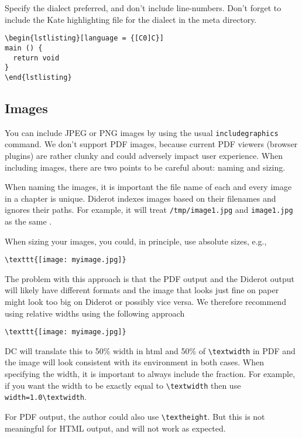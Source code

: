 \begin{example}
Specify the dialect preferred, and don't include line-numbers.
%
Don't forget to include the Kate highlighting file for the dialect in the meta directory.

\begin{verbatim}
\begin{lstlisting}[language = {[C0]C}]
main () {
  return void
}
\end{lstlisting}
\end{verbatim}
\end{example}
\subsection{Images}

You can include JPEG or PNG images by using the usual \lstinline`includegraphics` command.  
%
We don't support PDF images, because current PDF viewers (browser plugins) are rather clunky and could adversely impact user experience.
%
When including images, there are two points to be careful about: naming and sizing.
%

When naming the images, it is important the file name of each and every image in a chapter is unique.
%
Diderot indexes images based on their filenames and ignores their paths.
%
For example, it will treat
%
\lstinline`/tmp/image1.jpg` and  \lstinline`image1.jpg`
%
as the same .


When sizing your images, you could, in principle, use absolute sizes, e.g.,
\begin{lstlisting}
\texttt{[image: myimage.jpg]}
\end{lstlisting}
%
The problem with this approach is that the PDF output and the Diderot output will likely have different formats and the image that looks just fine on paper might look too big on Diderot or possibly vice versa.
%
We therefore recommend using relative widths using the following approach
\begin{lstlisting}
\texttt{[image: myimage.jpg]}
\end{lstlisting}
DC will translate this to 50\% width in html and 50\% of \lstinline`\textwidth` 
in PDF and the image will look consistent with its environment in both cases.  
%
When specifying the width, it is important to always include the fraction.  For example, if you want the width to be exactly equal to \lstinline`\textwidth` then use \lstinline`width=1.0\textwidth`.

\begin{note}
For PDF output, the author could also use \lstinline`\textheight`.
%
But this is not meaningful for HTML output, and will not work as expected.
\end{note}


